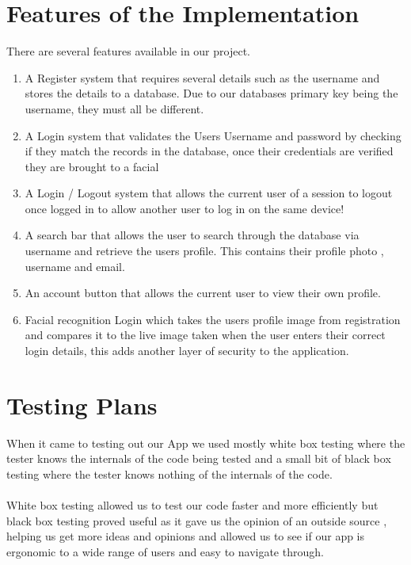 \documentclass{article}
\begin{document}
\newpage

\section{Features of the Implementation}

There are several features available in our project.
\begin{enumerate}
    \item A Register system that requires several details such as the username and stores the details to a database.
    Due to our databases primary key being the username, they must all be different.
    \item A Login system that validates the Users Username and password by checking if they match the records in the database, once their credentials are verified they are brought to a facial 
    \item A Login / Logout system that allows the current user of a session to logout once logged in to allow another user to log in on the same device!
    \item A search bar that allows the user to search through the database  via username and retrieve the users profile.
    This contains their profile photo , username and email.
    \item An account button that allows the current user to view their own profile.
    \item Facial recognition Login which takes the users profile image from registration and compares it to the live image taken when the user enters their correct login details, this adds another layer of security to the application.

\end{enumerate}

\newpage

\section{Testing Plans}

When it came to testing out our App we used mostly white box testing where the tester knows the internals of the code being tested and a small bit of black box testing where the tester knows nothing of the internals of the code.
\\
\\
White box testing allowed us to test our code faster and more efficiently but black box testing proved useful as it gave us the opinion of an outside source  , helping us get more ideas and opinions and allowed us to see if our app is ergonomic to a wide range of users and easy to navigate through.
\end{document}
